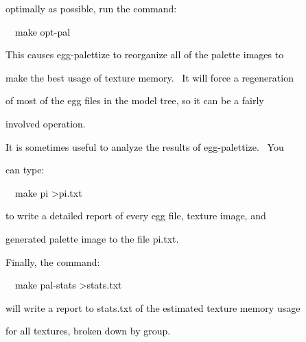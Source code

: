 \documentclass[a4paper]{article}
\newcommand\textstyleOOoComputerKeyWord[1]{\textrm{\textcolor[rgb]{0.0,0.0,0.5019608}{#1}}}
\begin{document}
{\color{black}
\textstyleOOoComputerKeyWord{\textcolor{black}{optimally as possible, run the command:}}}


\bigskip

{\color{black}
\textstyleOOoComputerKeyWord{\textcolor{black}{\ \ make opt-pal}}}


\bigskip

{\color{black}
\textstyleOOoComputerKeyWord{\textcolor{black}{This causes egg-palettize to reorganize all of the palette images to}}}

{\color{black}
\textstyleOOoComputerKeyWord{\textcolor{black}{make the best usage of texture memory. \ It will force a regeneration}}}

{\color{black}
\textstyleOOoComputerKeyWord{\textcolor{black}{of most of the egg files in the model tree, so it can be a fairly}}}

{\color{black}
\textstyleOOoComputerKeyWord{\textcolor{black}{involved operation.}}}


\bigskip

{\color{black}
\textstyleOOoComputerKeyWord{\textcolor{black}{It is sometimes useful to analyze the results of egg-palettize. \ You}}}

{\color{black}
\textstyleOOoComputerKeyWord{\textcolor{black}{can type:}}}

\clearpage
\bigskip


\bigskip

{\color{black}
\textstyleOOoComputerKeyWord{\textcolor{black}{\ \ make pi {\textgreater}pi.txt}}}


\bigskip

{\color{black}
\textstyleOOoComputerKeyWord{\textcolor{black}{to write a detailed report of every egg file, texture image, and}}}

{\color{black}
\textstyleOOoComputerKeyWord{\textcolor{black}{generated palette image to the file pi.txt.}}}


\bigskip

{\color{black}
\textstyleOOoComputerKeyWord{\textcolor{black}{Finally, the command:}}}


\bigskip

{\color{black}
\textstyleOOoComputerKeyWord{\textcolor{black}{\ \ make pal-stats {\textgreater}stats.txt}}}


\bigskip

{\color{black}
\textstyleOOoComputerKeyWord{\textcolor{black}{will write a report to stats.txt of the estimated texture memory usage}}}

{\color{black}
\textstyleOOoComputerKeyWord{\textcolor{black}{for all textures, broken down by group.}}}
\end{document}
